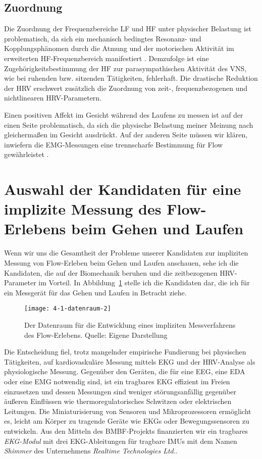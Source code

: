 \subsection{Zuordnung}
\label{sub:zuordnung}
Die Zuordnung der Frequenzbereiche \ac{LF} und \ac{HF} unter physischer Belastung ist problematisch, da sich ein mechanisch bedingtes Resonanz- und Kopplungsphänomen durch die Atmung und der motorischen Aktivität im erweiterten \ac{HF}-Frequenzbereich manifestiert \citep[vgl.][S.~62]{Hoos2010}. Demzufolge ist eine Zugehörigkeitsbestimmung der \ac{HF} zur parasympathischen Aktivität des \ac{VNS}, wie bei ruhenden bzw. sitzenden Tätigkeiten, fehlerhaft. Die drastische Reduktion der \ac{HRV} erschwert zusätzlich die Zuordnung von zeit-, frequenzbezogenen und nichtlinearen \ac{HRV}-Parametern.

Einen positiven Affekt im Gesicht während des Laufens zu messen ist auf der einen Seite problematisch, da sich die physische Belastung meiner Meinung nach gleichermaßen im Gesicht ausdrückt. Auf der anderen Seite müssen wir klären, inwiefern die \ac{EMG}-Messungen eine trennscharfe Bestimmung für Flow gewährleistet \citep[vgl.][]{Peifer2012}.

\section{Auswahl der Kandidaten für eine implizite Messung des Flow-Erlebens beim Gehen und Laufen}
\label{sec:auswahl_der_kandidaten}
Wenn wir uns die Gesamtheit der Probleme unserer Kandidaten zur impliziten Messung von Flow-Erleben beim Gehen und Laufen anschauen, sehe ich die Kandidaten, die auf der Biomechanik beruhen und die zeitbezogenen \ac{HRV}-Parameter im Vorteil. In Abbildung~\ref{fig:4_1_datenraum} stelle ich die Kandidaten dar, die ich für ein Messgerät für das Gehen und Laufen in Betracht ziehe.

\begin{figure}[t]
	\centering
		\texttt{[image: 4-1-datenraum-2]}
	\caption[Der Datenraum für die Entwicklung eines impliziten Messverfahrens des Flow-Erlebens]{Der Datenraum für die Entwicklung eines impliziten Messverfahrens des Flow-Erlebens. Quelle: Eigene Darstellung}
	\label{fig:4_1_datenraum}
\end{figure}

Die Entscheidung fiel, trotz mangelnder empirische Fundierung bei physischen Tätigkeiten, auf kardiovaskuläre Messung mittels \ac{EKG} und der \ac{HRV}-Analyse als physiologische Messung. Gegenüber den Geräten, die für eine \ac{EEG}, eine \ac{EDA} oder eine \ac{EMG} notwendig sind, ist ein tragbares \ac{EKG} effizient im Freien einzusetzen und dessen Messungen sind weniger störungsanfällig gegenüber äußeren Einflüssen wie thermoregulatorisches Schwitzen oder elektrischen Leitungen. Die Miniaturisierung von Sensoren und Mikroprozessoren ermöglicht es, leicht am Körper zu tragende Geräte wie \acp{EKG} oder Bewegungssensoren zu entwickeln. Aus den Mitteln des \acs{BMBF}-Projekts finanzierten wir ein tragbares \emph{EKG-Modul} mit drei \ac{EKG}-Ableitungen für tragbare \acp{IMU} mit dem Namen \emph{Shimmer} des Unternehmens \emph{Realtime Technologies Ltd.}.

